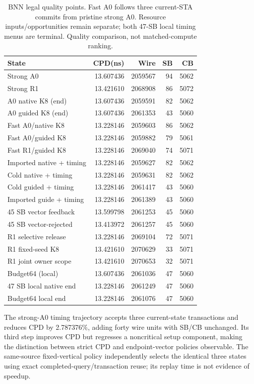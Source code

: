 \documentclass[conference,10pt]{IEEEtran}
\begin{document}
\begin{table}[t]
\centering\caption{BNN legal quality points. Fast A0 follows three current-STA commits from pristine strong A0. Resource inputs/opportunities remain separate; both 47-SB local timing menus are terminal. Quality comparison, not matched-compute ranking.}
\label{tab:bnn}
\small
\begin{tabular}{lrrrr}\hline
State & CPD(ns) & Wire & SB & CB\\\hline
Strong A0 &13.607436&2059567&94&5062\\
Strong R1 &13.421610&2068908&86&5072\\
A0 native K8 (end) &13.607436&2059591&82&5062\\
A0 guided K8 (end) &13.607436&2061353&43&5060\\
Fast A0/native K8 &13.228146&2059603&86&5062\\
Fast A0/guided K8 &13.228146&2059882&79&5061\\
Fast R1/guided K8 &13.228146&2069040&74&5071\\
Imported native + timing &13.228146&2059627&82&5062\\
Cold native + timing &13.228146&2059631&82&5062\\
Cold guided + timing &13.228146&2061417&43&5060\\
Imported guide + timing &13.228146&2061389&43&5060\\
45 SB vector feedback &13.599798&2061253&45&5060\\
45 SB vector-rejected &13.413972&2061257&45&5060\\
R1 selective release &13.228146&2069104&72&5071\\
R1 fixed-seed K8 &13.421610&2070629&33&5071\\
R1 joint owner scope &13.421610&2070653&32&5071\\
Budget64 (local) &13.607436&2061036&47&5060\\
47 SB local native end &13.228146&2061249&47&5060\\
Budget64 local end &13.228146&2061076&47&5060\\\hline
\end{tabular}
\end{table}
The strong-A0 timing trajectory accepts three current-state transactions and reduces CPD by 2.787376\%, adding forty wire units with SB/CB unchanged. Its third step improves CPD but regresses a noncritical setup component, making the distinction between strict CPD and endpoint-vector policies observable. The same-source fixed-vertical policy independently selects the identical three states using exact completed-query/transaction reuse; its replay time is not evidence of speedup.
\end{document}
